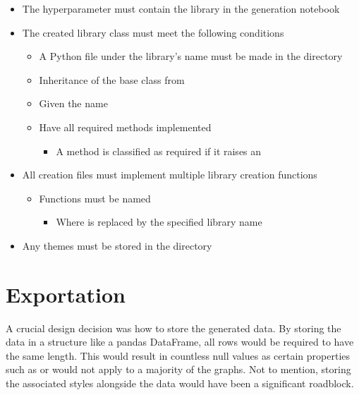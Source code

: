 \begin{itemize}
    \item The  hyperparameter must contain the library in the generation notebook
    \item The created library class must meet the following conditions
    \begin{itemize}
        \item A Python file under the library's name must be made in the  directory
        \item Inheritance of the base  class from 
        \item Given the name 
        \item Have all required methods implemented
        \begin{itemize}
            \item A method is classified as required if it raises an 
        \end{itemize}
    \end{itemize}
    \item All creation files must implement multiple library creation functions
    \begin{itemize}
        \item Functions must be named  \begin{itemize}
            \item Where  is replaced by the specified library name
        \end{itemize}
    \end{itemize}
    \item Any themes must be stored in the  directory
\end{itemize}

\section{Exportation}
A crucial design decision was how to store the generated data. By storing the data in a structure like a pandas DataFrame, all rows would be required to have the same length. This would result in countless null values as certain properties such as  or  would not apply to a majority of the graphs. Not to mention, storing the associated styles alongside the data would have been a significant roadblock.

\hfill

